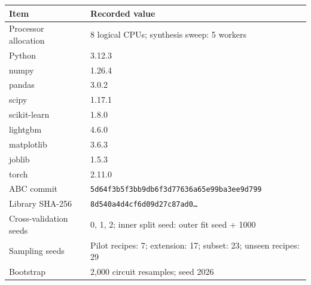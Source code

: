 \begin{tabular}{@{}ll@{}}
\toprule
\textbf{Item} & \textbf{Recorded value} \\
\midrule
Processor allocation & 8 logical CPUs; synthesis sweep: 5 workers \\
Python & 3.12.3 \\
numpy & 1.26.4 \\
pandas & 3.0.2 \\
scipy & 1.17.1 \\
scikit-learn & 1.8.0 \\
lightgbm & 4.6.0 \\
matplotlib & 3.6.3 \\
joblib & 1.5.3 \\
torch & 2.11.0 \\
ABC commit & \texttt{5d64f3b5f3bb9db6f3d77636a65e99ba3ee9d799} \\
Library SHA-256 & \texttt{8d540a4d4cf6d09d27c87ad0\ldots} \\
Cross-validation seeds & 0, 1, 2; inner split seed: outer fit seed + 1000 \\
Sampling seeds & Pilot recipes: 7; extension: 17; subset: 23; unseen recipes: 29 \\
Bootstrap & 2,000 circuit resamples; seed 2026 \\
\bottomrule
\end{tabular}

